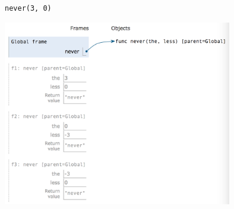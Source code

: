 \documentclass{exam}
\begin{document}
\begin{questions}
\begin{lstlisting}
never(3, 0)
\end{lstlisting}


\begin{solution}
\includegraphics[width=10cm]{env2}
\end{solution}
\end{questions}

\clearpage
\end{document}
